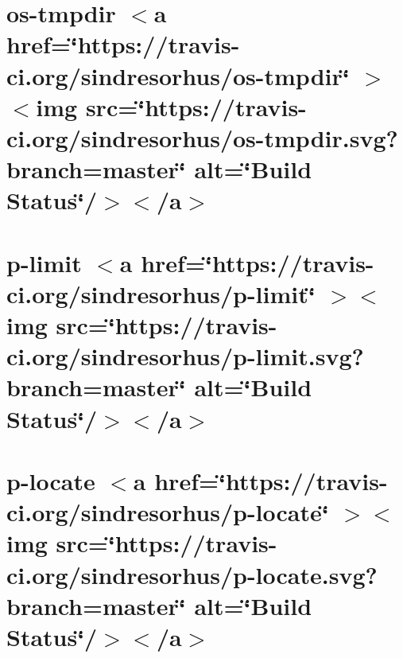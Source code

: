 \documentclass[twoside]{book}
\newcommand{\+}{\discretionary{\mbox{\scriptsize$\hookleftarrow$}}{}{}}
\begin{document}
\chapter{os-\/tmpdir \texorpdfstring{$<$}{<}a href=\char`\"{}https\+://travis-\/ci.\+org/sindresorhus/os-\/tmpdir\char`\"{} \texorpdfstring{$>$}{>}\texorpdfstring{$<$}{<}img src=\char`\"{}https\+://travis-\/ci.\+org/sindresorhus/os-\/tmpdir.\+svg?branch=master\char`\"{} alt=\char`\"{}\+Build Status\char`\"{}/\texorpdfstring{$>$}{>}\texorpdfstring{$<$}{<}/a\texorpdfstring{$>$}{>}}
\label{md__c___users_vaishnavi_jadhav__desktop__developer_code_mean_stack_example_client_node_modules_os_tmpdir_readme}

\chapter{p-\/limit \texorpdfstring{$<$}{<}a href=\char`\"{}https\+://travis-\/ci.\+org/sindresorhus/p-\/limit\char`\"{} \texorpdfstring{$>$}{>}\texorpdfstring{$<$}{<}img src=\char`\"{}https\+://travis-\/ci.\+org/sindresorhus/p-\/limit.\+svg?branch=master\char`\"{} alt=\char`\"{}\+Build Status\char`\"{}/\texorpdfstring{$>$}{>}\texorpdfstring{$<$}{<}/a\texorpdfstring{$>$}{>}}
\label{md__c___users_vaishnavi_jadhav__desktop__developer_code_mean_stack_example_client_node_modules_p_limit_readme}

\chapter{p-\/locate \texorpdfstring{$<$}{<}a href=\char`\"{}https\+://travis-\/ci.\+org/sindresorhus/p-\/locate\char`\"{} \texorpdfstring{$>$}{>}\texorpdfstring{$<$}{<}img src=\char`\"{}https\+://travis-\/ci.\+org/sindresorhus/p-\/locate.\+svg?branch=master\char`\"{} alt=\char`\"{}\+Build Status\char`\"{}/\texorpdfstring{$>$}{>}\texorpdfstring{$<$}{<}/a\texorpdfstring{$>$}{>}}
\label{md__c___users_vaishnavi_jadhav__desktop__developer_code_mean_stack_example_client_node_modules_p_locate_readme}

\end{document}
